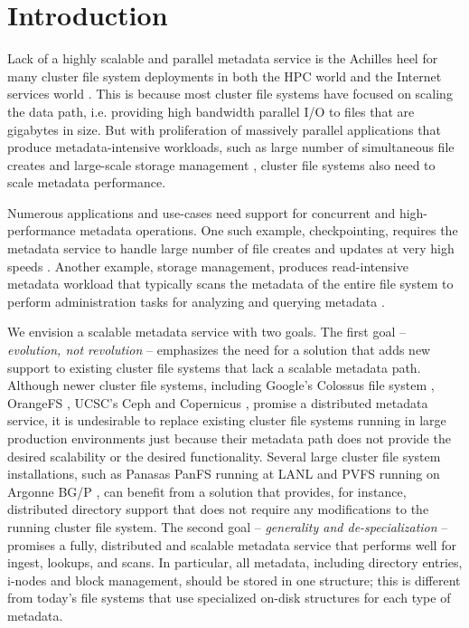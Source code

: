 \section{Introduction}

Lack of a highly scalable and parallel metadata service is the 
Achilles heel for many cluster file system deployments in both the HPC world 
\cite{hpcs-io:2008, hecfsio:tr06} and the Internet services world \cite{HDFS}.
This is because most cluster file systems have focused on scaling the
data path, i.e. providing high bandwidth parallel I/O to files that are 
gigabytes in size.
But with proliferation of massively parallel applications that produce 
metadata-intensive workloads, such as large number of simultaneous file creates
\cite{PLFS} and large-scale storage management \cite{issdm}, cluster file systems 
also need to scale metadata performance.

Numerous applications and use-cases need support for concurrent and 
high-performance metadata operations.
One such example, checkpointing, requires the metadata service to
handle large number of file creates and updates at very high speeds 
\cite{PLFS}.
Another example, storage management, produces read-intensive metadata workload
that typically scans the metadata of the entire file system to perform
administration tasks for analyzing and querying metadata \cite{filemgmt-ucsc, magellan-ucsc}.

We envision a scalable metadata service with two goals. 
The first goal -- \textit{evolution, not revolution} -- emphasizes the need for
a solution that adds new support to existing cluster file systems that lack a 
scalable metadata path.
Although newer cluster file systems, including Google's Colossus file system 
\cite{50mfiles-in-googlefs:fikes10}, OrangeFS \cite{OrangeFS}, UCSC's Ceph \cite{ceph:weil06} and 
Copernicus \cite{sfs-ucsc}, promise a distributed metadata 
service, it is 
undesirable to replace existing cluster file systems running in large production
environments just because their metadata path does not provide the desired
scalability or the desired functionality.
Several large cluster file system installations, such as Panasas PanFS running
at LANL \cite{panfs:welch08} and PVFS running on Argonne BG/P 
\cite{bgp, pvfs:www}, can 
benefit from a solution that provides, for instance, distributed directory support 
that does not require any modifications to the running cluster file system.
The second goal -- \textit{generality and de-specialization} -- promises a 
fully, distributed and
scalable metadata service that performs well for ingest, lookups, and scans.
In particular, all metadata, including directory entries, i-nodes and block
management, should be stored in one structure; this is different from
today's file systems that use specialized on-disk structures for each type of 
metadata.

